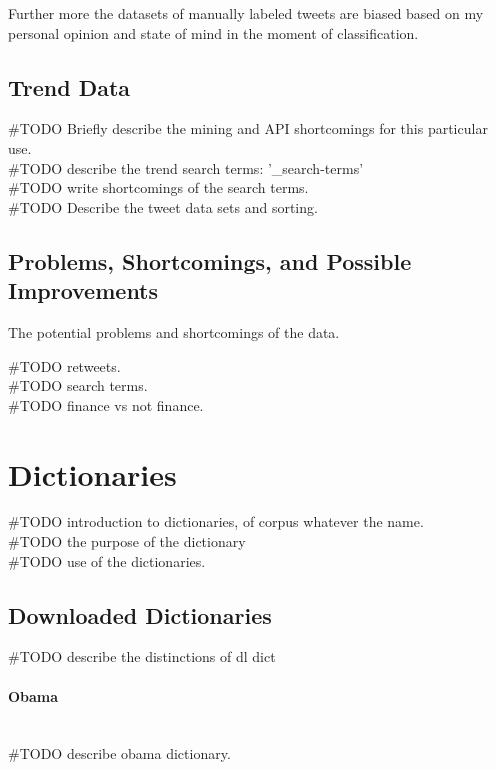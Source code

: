 Further more the datasets of manually labeled tweets are biased based on my
personal opinion and state of mind in the moment of classification.  

\subsection{Trend Data}
#TODO Briefly describe the mining and API shortcomings for this particular
use.\\
#TODO describe the trend search terms: '\_search-terms'\\
#TODO write shortcomings of the search terms. \\
#TODO Describe the tweet data sets and sorting. \\ 

\subsection{Problems, Shortcomings, and Possible Improvements}
The potential problems and shortcomings of the data. 

#TODO retweets.\\ 
#TODO search terms.\\
#TODO finance vs not finance.\\

\section{Dictionaries}\label{data:dictionaries}
#TODO introduction to dictionaries, of corpus whatever the name. \\
#TODO the purpose of the dictionary\\
#TODO use of the dictionaries. \\
%

\subsection{Downloaded Dictionaries}
#TODO describe the distinctions of dl dict

\paragraph{Obama}
\hspace{0pt}\\
#TODO describe obama dictionary.\\ 


